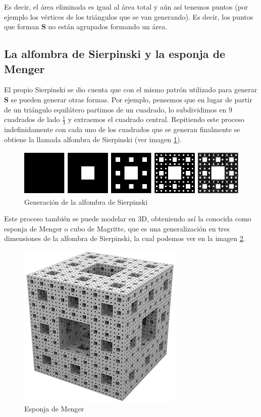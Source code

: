 Es decir, el área eliminada es igual al área total y aún así tenemos puntos (por ejemplo los vértices de los triángulos que se van generando). Es decir, los puntos que forman \textbf{S} no están agrupados formando un área.

\subsection{La alfombra de Sierpinski y la esponja de Menger}
\label{subsection:alfombra-esponja}

El propio Sierpinski se dio cuenta que con el mismo patrón utilizado para generar \textbf{S} se pueden generar otras formas. Por ejemplo, pensemos que en lugar de partir de un triángulo equilátero partimos de un cuadrado, lo subdividimos en 9 cuadrados de lado $\frac 1 3$ y extraemos el cuadrado central. Repitiendo este proceso indefinidamente con cada uno de los cuadrados que se generan finalmente se obtiene la llamada alfombra de Sierpinski (ver imagen \ref{fig:alfombra-Sierpinski}).

\begin{figure} [h]
\centering
\includegraphics[scale = 0.6]{img/Sierpinski-carpet.png}
\caption{Generación de la alfombra de Sierpinski}
 \label{fig:alfombra-Sierpinski}
\end{figure}

Este proceso también se puede modelar en 3D, obteniendo así la conocida como esponja de Menger o cubo de Magritte, que es una generalización en tres dimensiones de la alfombra de Sierpinski, la cual podemos ver en la imagen \ref{fig:esponja-menger}.

\begin{figure} [h]
\centering
\includegraphics[scale = 0.6]{img/esponja_menger.png}
\caption{Esponja de Menger}
 \label{fig:esponja-menger}
\end{figure}

